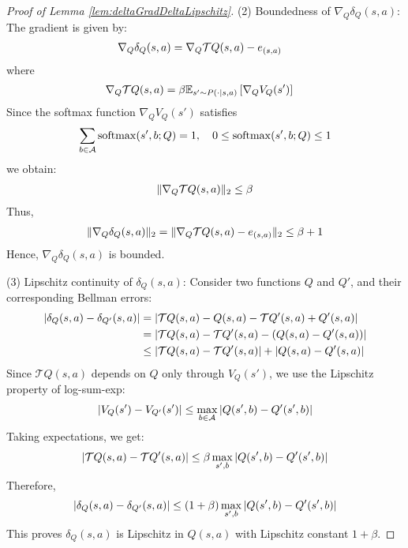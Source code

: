\begin{proof}[Proof of Lemma \ref{lem:deltaGradDeltaLipschitz}]
\noindent (2) Boundedness of \( \nabla_Q \delta_Q(s,a) \):  
The gradient is given by:
\begin{align}
    \nabla_Q \delta_Q(s,a) &= \nabla_Q \mathcal{T} Q(s,a) - e_{(s,a)} \notag
\end{align}
where
\begin{align}
    \nabla_Q \mathcal{T} Q(s,a) &= \beta \mathbb{E}_{s' \sim P(\cdot \mid s,a)} \left[ \nabla_Q V_Q(s') \right] \notag
\end{align}
Since the softmax function \( \nabla_Q V_Q(s') \) satisfies
\begin{align}
    \sum_{b \in \mathcal{A}} \mathrm{softmax}(s',b; Q) = 1, \quad 0 \leq \mathrm{softmax}(s',b;Q) \leq 1 \notag
\end{align}
we obtain:
\begin{align}
    \|\nabla_Q \mathcal{T} Q(s,a)\|_2 \leq \beta \notag
\end{align}
Thus,
\begin{align}
    \|\nabla_Q \delta_Q(s,a)\|_2 = \|\nabla_Q \mathcal{T} Q(s,a) - e_{(s,a)}\|_2 \leq \beta + 1 \notag
\end{align}
Hence, \( \nabla_Q \delta_Q(s,a) \) is bounded.

\noindent (3) Lipschitz continuity of \( \delta_Q(s,a) \):  
Consider two functions \( Q \) and \( Q' \), and their corresponding Bellman errors:
\begin{align}
    \left| \delta_Q(s, a) - \delta_{Q'}(s, a) \right| &= \left| \mathcal{T}Q(s,a) - Q(s,a) - \mathcal{T}Q'(s,a) + Q'(s,a) \right| \notag
    \\
    &= \left| \mathcal{T}Q(s,a) - \mathcal{T}Q'(s,a) - (Q(s,a) - Q'(s,a)) \right| \notag
    \\
    &\leq \left| \mathcal{T}Q(s,a) - \mathcal{T}Q'(s,a) \right| + \left| Q(s,a) - Q'(s,a) \right| \notag
\end{align}
Since \( \mathcal{T}Q(s,a) \) depends on \( Q \) only through \( V_Q(s') \), we use the Lipschitz property of log-sum-exp:
\begin{align}
    |V_Q(s') - V_{Q'}(s')| \leq \max_{b \in \mathcal{A}} |Q(s',b) - Q'(s',b)| \notag
\end{align}
Taking expectations, we get:
\begin{align}
    |\mathcal{T}Q(s,a) - \mathcal{T}Q'(s,a)| \leq \beta \max_{s',b} |Q(s',b) - Q'(s',b)| \notag
\end{align}
Therefore,
\begin{align}
    |\delta_Q(s,a) - \delta_{Q'}(s,a)| \leq (1 + \beta) \max_{s',b} |Q(s',b) - Q'(s',b)| \notag
\end{align}
This proves \( \delta_Q(s,a) \) is Lipschitz in \( Q(s,a) \) with Lipschitz constant \( 1+\beta \).


\end{proof}
